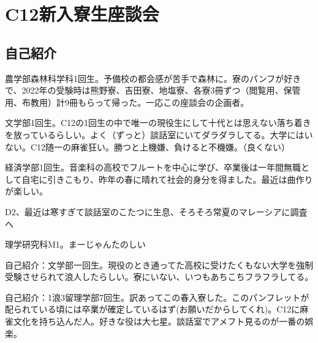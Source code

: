 \section{C12新入寮生座談会} \label{sec:C12}



\subsection{自己紹介}

農学部森林科学科1回生。予備校の都会感が苦手で森林に。寮のパンフが好きで、2022年の受験時は熊野寮、吉田寮、地塩寮、各寮3冊ずつ（閲覧用、保管用、布教用）計9冊もらって帰った。一応この座談会の企画者。

文学部1回生。C12の1回生の中で唯一の現役生にして十代とは思えない落ち着きを放っているらしい。よく（ずっと）談話室にいてダラダラしてる。大学にはいない。C12随一の麻雀狂い。勝つと上機嫌、負けると不機嫌。（良くない）

経済学部1回生。音楽科の高校でフルートを中心に学び、卒業後は一年間無職として自宅に引きこもり、昨年の春に晴れて社会的身分を得ました。最近は曲作りが楽しい。

D2、最近は寒すぎて談話室のこたつに生息、そろそろ常夏のマレーシアに調査へ

理学研究科M1。まーじゃんたのしい

自己紹介：文学部一回生。現役のとき通ってた高校に受けたくもない大学を強制受験させられて浪人したらしい。寮にいない、いつもあちこちフラフラしてる。

自己紹介：1浪3留理学部7回生。訳あってこの春入寮した。このパンフレットが配られている頃には卒業が確定しているはず(お願いだからしてくれ)。C12に麻雀文化を持ち込んだ人。好きな役は大七星。談話室でアメフト見るのが一番の娯楽。




